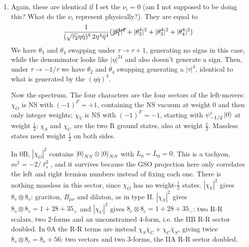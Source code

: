 \documentclass[11pt, class=article, crop=false]{standalone}
\begin{document}
\begin{enumerate}
	Under $\tau \to -1/\tau$, the $\frac1{(\sqrt{\tau_2} \eta \bar \eta)^8}$ out front is invariant. On the other hand, the $\theta$ functions transform as $\theta^4\twist00 \to (-i\tau)^2 \theta^4\twist00$, $\theta^4\twist01 \to (-i\tau)^2 \theta^4\twist10$, $\theta^4\twist10 \to (-i\tau)^2 \theta^4\twist01$. These are exactly compensated by the $\eta$ transformations in the denominator, and no overall sign is picked up
	
	For IIA we have similarly
	\[
		\frac{(\chi_V - \chi_C)(\bar \chi_V - \bar \chi_S)}{(\sqrt \tau_2 \eta \bar \eta)^8} = \frac{1}{(\sqrt \tau_2 \eta \bar \eta)^8} \frac12 \sum_{a,b=0}^1 (-1)^{a+b} \frac{\theta^4\twist{a}{b} }{\eta^4}
		\times \frac12 \sum_{\bar a, \bar b=0}^1 (-1)^{\bar a + \bar b + \bar a \bar b} \frac{\bar \theta^4 \twist{\bar a}{\bar b}}{\bar \eta^4}
	\]
	Again, the holomorphic part transforms as before and as we have set the $\nu_i$ to zero, we have the same partition function. Using \textbf{D.18}, we see that each of the four above sums are zero since they are equal to a product of $\theta_1 = 0$.
	
 	\item Again, these are identical if I set the $\nu_i = 0$ (am I not supposed to be doing this? What do the $\nu_i$ represent physically?). They are equal to
	\[
		\frac{1}{(\sqrt {\tau_2} \eta \bar \eta)^8\, 2 \eta^4 \bar \eta^4} (\cancel{|\theta_1^4|^2} + |\theta_2^4|^2 + |\theta_3^4|^2 + |\theta_4^4|^2)
	\]
	We have $\theta_3$ and $\theta_4$ swapping under $\tau \to \tau+1$, generating no signs in this case, while the denominator looks like $|\eta|^{24}$ and also doesn't generate a sign. Then, under $\tau \to -1/\tau$ we have $\theta_2$ and $\theta_4$ swapping generating a $|\tau|^4$, identical to what is generated by the $(\eta \bar \eta)^4$. 
	
	Now the spectrum. The four characters are the four sectors of the left-movers: $\chi_O$ is NS with $(-1)^F = +1$, containing the NS vacuum at weight $0$ and then only integer weights; $\chi_V$ is NS with $(-1)^F = -1$, starting with $\psi^i_{-1/2} \ket 0$ at weight $\frac12$; $\chi_S$ and $\chi_C$ are the two R ground states, also at weight $\frac12$. Massless states need weight $\frac12$ on both sides.
	
	In 0B, $|\chi_O|^2$ contains $\ket 0_{NS} \otimes \ket 0_{NS}$ with $L_0 = \bar L_0 = 0$. This is a tachyon, $m^2 = -2/\ell_s^2$, and it survives because the GSO projection here only correlates the left and right fermion numbers instead of fixing each one. There is nothing massless in this sector, since $\chi_O$ has no weight-$\frac12$ states. $|\chi_V|^2$ gives $8_v \otimes 8_v$: graviton, $B_{\mu \nu}$ and dilaton, as in type II. $|\chi_S|^2$ gives $8_s \otimes 8_s = 1 + 28 + 35_+$ and $|\chi_C|^2$ gives $8_c \otimes 8_c = 1 + 28 + 35_-$: two R-R scalars, two 2-forms and an unconstrained 4-form, i.e. the IIB R-R sector doubled. In 0A the R-R terms are instead $\chi_S \bar \chi_C + \chi_C \bar \chi_S$, giving twice $8_s \otimes 8_c = 8_v + 56$: two vectors and two 3-forms, the IIA R-R sector doubled.
	

\end{enumerate}
\end{document}
